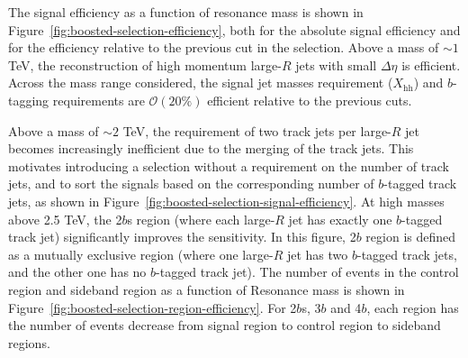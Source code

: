 The signal efficiency as a function of resonance mass is shown in Figure~\ref{fig:boosted-selection-efficiency}, both for the absolute signal efficiency and for the efficiency relative to the previous cut in the selection. Above a mass of $\sim\!1$ TeV, the reconstruction of high momentum large-$R$ jets with small $\Delta\eta$ is efficient. Across the mass range considered, the signal jet masses requirement ($X_\text{hh}$) and $b$-tagging requirements are $\mathcal{O}(20\%)$ efficient relative to the previous cuts. 

Above a mass of $\sim\!2$ TeV, the requirement of two track jets per large-$R$ jet becomes increasingly inefficient due to the merging of the track jets. This motivates introducing a selection without a requirement on the number of track jets, and to sort the signals based on the corresponding number of $b$-tagged track jets, as shown in Figure~\ref{fig:boosted-selection-signal-efficiency}. At high masses above 2.5 TeV, the 2$b$s region (where each large-$R$ jet has exactly one $b$-tagged track jet) significantly improves the sensitivity. In this figure, 2$b$ region is defined as a mutually exclusive region (where one large-$R$ jet has two $b$-tagged track jets, and the other one has no $b$-tagged track jet). The number of events in the control region and sideband region as a function of Resonance mass is shown in Figure~\ref{fig:boosted-selection-region-efficiency}. For 2$b$s, 3$b$ and 4$b$, each region has the number of events decrease from signal region to control region to sideband regions.


